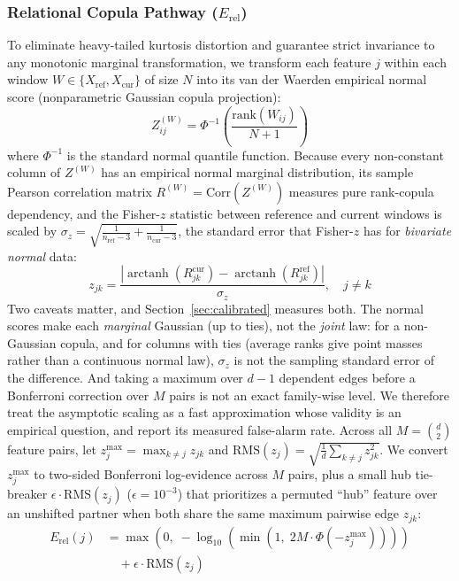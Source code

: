 \documentclass[10pt,conference]{IEEEtran}
\begin{document}
\subsubsection{Relational Copula Pathway (\texorpdfstring{$E_{\mathrm{rel}}$}{E\_rel})}
To eliminate heavy-tailed kurtosis distortion and guarantee strict invariance to
any monotonic marginal transformation, we transform each feature $j$ within
each window $W \in \{X_{\mathrm{ref}}, X_{\mathrm{cur}}\}$ of size $N$ into its
van der Waerden empirical normal score (nonparametric Gaussian copula
projection):
\begin{equation}
  Z^{(W)}_{ij} = \Phi^{-1}\left(\frac{\mathrm{rank}(W_{ij})}{N + 1}\right)
  \label{eq:copula}
\end{equation}
where $\Phi^{-1}$ is the standard normal quantile function. Because every
non-constant column of $Z^{(W)}$ has an empirical normal marginal distribution,
its sample Pearson correlation matrix $R^{(W)} = \mathrm{Corr}(Z^{(W)})$
measures pure rank-copula dependency, and the Fisher-$z$ statistic between reference
and current windows is scaled by
$\sigma_z = \sqrt{\frac{1}{n_{\mathrm{ref}} - 3} + \frac{1}{n_{\mathrm{cur}} - 3}}$,
the standard error that Fisher-$z$ has for \emph{bivariate normal} data:
\begin{equation}
  z_{jk} = \frac{\left|\operatorname{arctanh}(R^{\mathrm{cur}}_{jk})
                 - \operatorname{arctanh}(R^{\mathrm{ref}}_{jk})\right|}{\sigma_z},
  \quad j \neq k
  \label{eq:fisher_z}
\end{equation}
Two caveats matter, and Section~\ref{sec:calibrated} measures both. The normal
scores make each \emph{marginal} Gaussian (up to ties), not the \emph{joint} law:
for a non-Gaussian copula, and for columns with ties (average ranks give point
masses rather than a continuous normal law), $\sigma_z$ is not the sampling
standard error of the difference. And taking a maximum over $d-1$ dependent
edges before a Bonferroni correction over $M$ pairs is not an exact family-wise
level. We therefore treat the asymptotic scaling as a fast approximation whose
validity is an empirical question, and report its measured false-alarm rate.
Across all $M = \binom{d}{2}$ feature pairs, let $z_j^{\max} = \max_{k \neq j} z_{jk}$
and $\mathrm{RMS}(z_j) = \sqrt{\frac{1}{d}\sum_{k \neq j} z_{jk}^2}$. We convert
$z_j^{\max}$ to two-sided Bonferroni log-evidence across $M$ pairs,
plus a small hub tie-breaker $\epsilon \cdot \mathrm{RMS}(z_j)$ ($\epsilon = 10^{-3}$)
that prioritizes a permuted ``hub'' feature over an unshifted partner when both
share the same maximum pairwise edge $z_{jk}$:
\begin{align}
  E_{\mathrm{rel}}(j) &= \max\left(0,\; -\log_{10}\left(
    \min\left(1,\; 2 M \cdot \Phi(-z_j^{\max})\right)
  \right)\right) \nonumber \\
  &\quad + \epsilon \cdot \mathrm{RMS}(z_j)
  \label{eq:e_rel}
\end{align}
\end{document}
